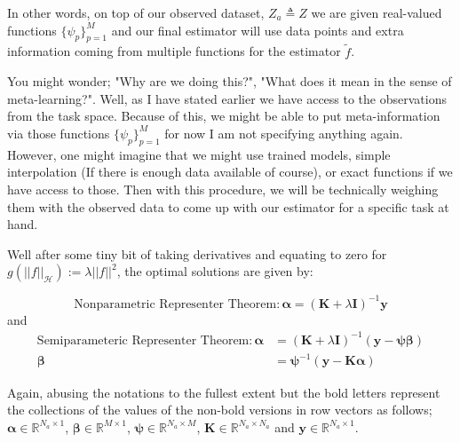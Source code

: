 \documentclass{tran-l}
\theoremstyle{definition}
\theoremstyle{remark}
\numberwithin{equation}{section}
\newcommand{\mR}{\mathbb{R}}
\begin{document}
{In other words, on top of our observed dataset, $Z_a\triangleq Z$ we are given real-valued functions $\{\psi_p\}_{p=1}^M$ and our final estimator will use data points and extra information coming from multiple functions for the estimator $\tilde{f}$. 

\color{red}
\rem  You might wonder; "Why are we doing this?",  "What does it mean in the sense of meta-learning?". Well, as I have stated earlier we have access to the observations from the task space. Because of this, we might be able to put meta-information via those functions $\{\psi_p\}_{p=1}^M$ for now I am not specifying anything again. However, one might imagine that we might use trained models, simple interpolation (If there is enough data available of course), or exact functions if we have access to those. Then with this procedure, we will be technically weighing them with the observed data to come up with our estimator for a specific task at hand. \color{black}

Well after some tiny bit of taking derivatives and equating to zero for $g(||f||_\mathcal{H}):=\lambda||f||^2$, the optimal solutions are given by:

\begin{equation}
  \text{Nonparametric Representer Theorem}: \boldsymbol{\alpha}=(\mathbf{K}+\lambda \mathbf{I})^{-1}\mathbf{y}
\end{equation}
and 
\begin{align}
\text{Semiparameteric Representer Theorem}: \boldsymbol{\alpha}&=(\mathbf{K}+\lambda\mathbf{I})^{-1}(\mathbf{y}-\boldsymbol{\psi}\boldsymbol{\beta}) \\ 
\boldsymbol{\beta}&=\boldsymbol{\psi}^{-1}(\mathbf{y} - \mathbf{K}\boldsymbol{\alpha})
\label{eq:optimum}
\end{align}

\rem Again, abusing the notations to the fullest extent but the bold letters represent the collections of the values of the non-bold versions in row vectors as follows;
\color{red}
$\boldsymbol{\alpha}\in\mR^{N_a\times 1}$, $\boldsymbol{\beta}\in\mR^{M\times 1}$, $\boldsymbol{\psi}\in\mR^{N_a\times M}$, $\mathbf{K}\in\mR^{N_a\times N_a}$ and $\mathbf{y}\in\mR^{N_a\times 1}$.

}
\end{document}
